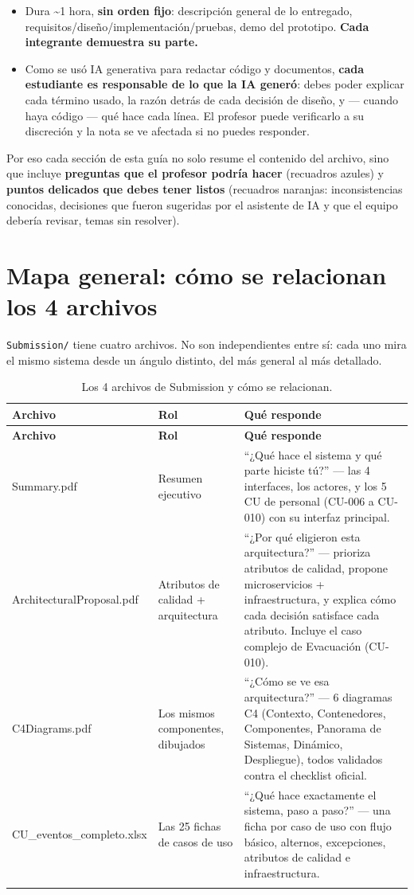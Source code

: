 \documentclass[12pt,a4paper]{article}
\begin{document}
\begin{itemize}
\item Dura \textasciitilde 1 hora, \textbf{sin orden fijo}: descripción general de lo entregado,
requisitos/diseño/implementación/pruebas, demo del prototipo. \textbf{Cada integrante demuestra su
parte.}
\item Como se usó IA generativa para redactar código y documentos, \textbf{cada estudiante es
responsable de lo que la IA generó}: debes poder explicar cada término usado, la razón detrás de
cada decisión de diseño, y --- cuando haya código --- qué hace cada línea. El profesor puede
verificarlo a su discreción y la nota se ve afectada si no puedes responder.
\end{itemize}

Por eso cada sección de esta guía no solo resume el contenido del archivo, sino que incluye
\textbf{preguntas que el profesor podría hacer} (recuadros azules) y \textbf{puntos delicados que
debes tener listos} (recuadros naranjas: inconsistencias conocidas, decisiones que fueron
sugeridas por el asistente de IA y que el equipo debería revisar, temas sin resolver).

\section{Mapa general: cómo se relacionan los 4 archivos}

\texttt{Submission/} tiene cuatro archivos. No son independientes entre sí: cada uno mira el mismo
sistema desde un ángulo distinto, del más general al más detallado.

\begin{longtable}{p{3cm}p{3.3cm}p{7.5cm}}
\toprule
\textbf{Archivo} & \textbf{Rol} & \textbf{Qué responde}\\
\midrule
\endfirsthead
\toprule
\textbf{Archivo} & \textbf{Rol} & \textbf{Qué responde}\\
\midrule
\endhead
Summary.pdf & Resumen ejecutivo & ``¿Qué hace el sistema y qué parte hiciste tú?'' --- las 4
interfaces, los actores, y los 5 CU de personal (CU-006 a CU-010) con su interfaz principal.\\[0.4em]
ArchitecturalProposal.pdf & Atributos de calidad + arquitectura & ``¿Por qué eligieron esta
arquitectura?'' --- prioriza atributos de calidad, propone microservicios + infraestructura, y
explica cómo cada decisión satisface cada atributo. Incluye el caso complejo de Evacuación
(CU-010).\\[0.4em]
C4Diagrams.pdf & Los mismos componentes, dibujados & ``¿Cómo se ve esa arquitectura?'' --- 6
diagramas C4 (Contexto, Contenedores, Componentes, Panorama de Sistemas, Dinámico, Despliegue),
todos validados contra el checklist oficial.\\[0.4em]
CU\_eventos\_completo.xlsx & Las 25 fichas de casos de uso & ``¿Qué hace exactamente el sistema,
paso a paso?'' --- una ficha por caso de uso con flujo básico, alternos, excepciones, atributos de
calidad e infraestructura.\\
\bottomrule
\caption{Los 4 archivos de Submission y cómo se relacionan.}
\end{longtable}
\end{document}
